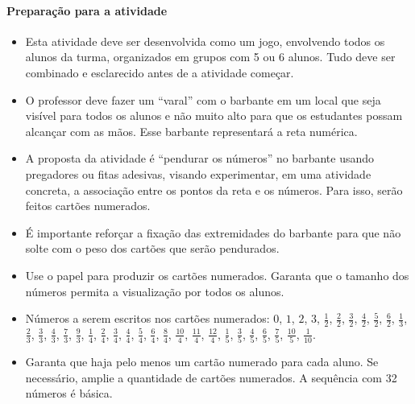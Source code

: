 \begin{atividade}
\paragraph{Preparação para a atividade}
\begin{itemize} %
  \item     Esta atividade deve ser desenvolvida como um jogo, envolvendo todos os alunos da turma, organizados em grupos com 5 ou 6 alunos. Tudo deve ser combinado e esclarecido antes de a atividade começar.
  \item  O professor deve fazer um  ``varal'' com o barbante em um local que seja visível para todos os alunos e não muito alto para que os estudantes possam alcançar com as mãos. Esse barbante representará a reta numérica.
  \item A proposta da atividade é ``pendurar os números'' no barbante usando pregadores ou fitas adesivas, visando experimentar, em uma atividade concreta, a associação entre os pontos da reta e os números. Para isso, serão feitos cartões numerados.
  \item É importante reforçar a fixação das extremidades do barbante para que não solte com o peso dos cartões que serão pendurados.
  \item Use o papel para produzir os cartões numerados. Garanta que o tamanho dos números permita a visualização por todos os alunos. 
  \item  Números a serem escritos nos cartões numerados: $0$, $1$, $2$, $3$, $\frac{1}{2}$, $\frac{2}{2}$, $\frac{3}{2}$, $\frac{4}{2}$, $\frac{5}{2}$, $\frac{6}{2}$, $\frac{1}{3}$, $\frac{2}{3}$, $\frac{3}{3}$, $\frac{4}{3}$, $\frac{7}{3}$, $\frac{9}{3}$, $\frac{1}{4}$, $\frac{2}{4}$, $\frac{3}{4}$, $\frac{4}{4}$, $\frac{5}{4}$, $\frac{6}{4}$, $\frac{8}{4}$, $\frac{10}{4}$, $\frac{11}{4}$, $\frac{12}{4}$, $\frac{1}{5}$, $\frac{3}{5}$, $\frac{4}{5}$, $\frac{6}{5}$, $\frac{7}{5}$, $\frac{10}{5}$, $\frac{1}{10}$.
  \item Garanta que haja pelo menos um cartão numerado para cada aluno. Se necessário, amplie a quantidade de cartões numerados. A sequência com 32 números é básica. 
\end{itemize} %


\end{atividade}

